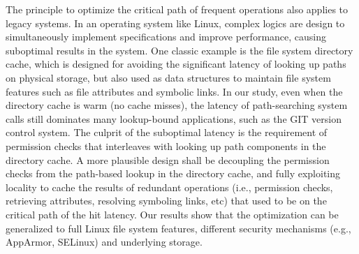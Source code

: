 %


The principle to optimize the critical path of frequent operations
also applies to legacy systems.
In an operating system like Linux,
complex logics are design to simultaneously implement specifications
and improve performance,
causing suboptimal results in the system.
One classic example is the file system directory cache,
which is designed for
avoiding the significant latency of looking up paths
on physical storage,
but also used as data structures to maintain file system features
such as file attributes and symbolic links.
In our study, even when the directory cache is warm (no cache misses),
the latency of path-searching system calls
still dominates many lookup-bound applications,
such as the GIT version control system.
The culprit of the suboptimal latency is
the requirement of permission checks that
interleaves with looking up path components in the directory cache.
A more plausible design
shall be decoupling the permission checks
from the path-based lookup in the directory cache,
and fully exploiting locality to cache the results of redundant operations
(i.e., permission checks, retrieving attributes, resolving symboling links, etc)
that used to be on the critical path of the hit latency.
Our results show that the optimization can be generalized
to full Linux file system features,
different security mechanisms (e.g., AppArmor, SELinux)
and underlying storage.



